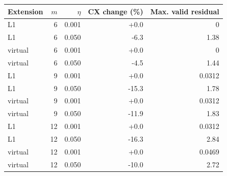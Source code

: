 \begin{tabular}{lrrrr}
\toprule
Extension & $m$ & $\eta$ & CX change (\%) & Max. valid residual\\
\midrule
L1 & 6 & 0.001 & +0.0 & 0\\
L1 & 6 & 0.050 & -6.3 & 1.38\\
virtual & 6 & 0.001 & +0.0 & 0\\
virtual & 6 & 0.050 & -4.5 & 1.44\\
L1 & 9 & 0.001 & +0.0 & 0.0312\\
L1 & 9 & 0.050 & -15.3 & 1.78\\
virtual & 9 & 0.001 & +0.0 & 0.0312\\
virtual & 9 & 0.050 & -11.9 & 1.83\\
L1 & 12 & 0.001 & +0.0 & 0.0312\\
L1 & 12 & 0.050 & -16.3 & 2.84\\
virtual & 12 & 0.001 & +0.0 & 0.0469\\
virtual & 12 & 0.050 & -10.0 & 2.72\\
\bottomrule
\end{tabular}
